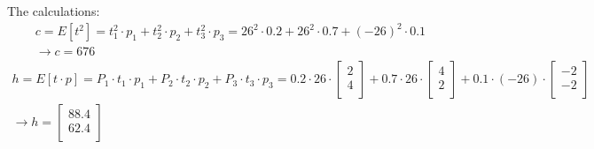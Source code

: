 The calculations:
\[ 
\begin{gathered}
	c = E[t^2] = t_1^2 \cdot p_1 + t_2^2 \cdot p_2 + t_3^2 \cdot p_3 = 26^2 \cdot 0.2 + 26^2 \cdot 0.7 + (-26)^2 \cdot 0.1\\
	\rightarrow c = 676
\end{gathered}
\]
\[
\begin{gathered}
h = E[t \cdot p] = P_1 \cdot t_1 \cdot p_1 + P_2 \cdot t_2 \cdot p_2 + P_3 \cdot t_3 \cdot p_3 = 0.2 \cdot 26 \cdot \left[
\begin{array}{cc}  
	2 \\  
	4 \\
\end{array}
\right] + 0.7 \cdot 26 \cdot \left[ \begin{array}{cc}  
	4 \\  
	2 \\
\end{array}
\right] + 0.1 \cdot (-26) \cdot \left[ \begin{array}{cc}  
	-2 \\  
	-2 \\
\end{array}
\right] \\
\rightarrow h = \left[
	\begin{array}{c}  
		88.4 \\  
		62.4 \\
	\end{array}
	\right]
\end{gathered}
\]
\\
